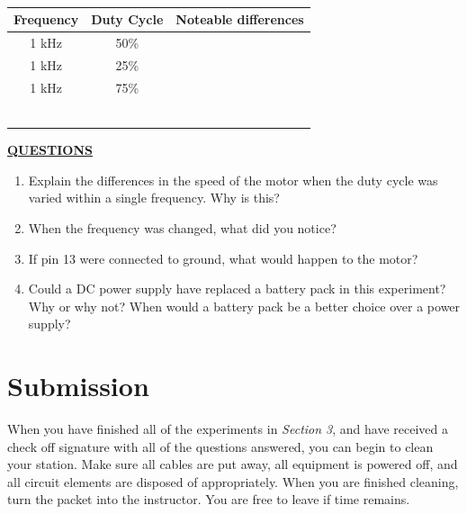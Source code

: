 \documentclass[12pt]{article}
\begin{document}
\begin{table}[H]
\centering
\begin{tabular}{|c|c|c|} %
    \hline
         \hspace{1.5cm}Frequency\hspace{1.5cm} & \hspace{1.5cm}Duty Cycle\hspace{1.5cm} & \hspace{1cm} Noteable differences \hspace{1cm} \\ \hline \hline
         1 kHz &  50\%   &       \\ \hline
         1 kHz &  25\%   &       \\ \hline
         1 kHz &  75\%   &       \\ \hline
               &         &       \\ \hline
               &         &       \\ \hline
               &         &       \\ \hline
               &         &       \\ \hline
               &         &       \\ \hline
               &         &       \\ \hline
                    
        
\end{tabular}
\caption{}
\end{table}

\textbf{\underline{QUESTIONS}}
\begin{enumerate}
    \item Explain the differences in the speed of the motor when the duty cycle was varied within a single frequency. Why is this?
        \fillwithlines{1in}
    \item When the frequency was changed, what did you notice?
        \fillwithlines{1in}
    \item If pin 13 were connected to ground, what would happen to the motor?
        \fillwithlines{1in}
    \newpage
    \item Could a DC power supply have replaced a battery pack in this experiment? Why or why not? When would a battery pack be a better choice over a power supply?
        \fillwithlines{1in}
\end{enumerate}

\checkoffsubsub

\section{Submission}

When you have finished all of the experiments in \textit{Section 3}, and have received a check off signature with all of the questions answered, you can begin to clean your station. Make sure all cables are put away, all equipment is powered off, and all circuit elements are disposed of appropriately. When you are finished cleaning, turn the packet into the instructor. You are free to leave if time remains.
\end{document}
